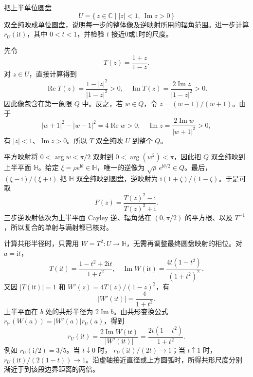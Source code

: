 \begin{exercise}\label{b3:ex:05-2}
把上半单位圆盘
\[
 U=\{\,z\in\mathbb C\mid |z|<1,\ \operatorname{Im}z>0\,\}
\]
双全纯映成单位圆盘，说明每一步的整体像及逆映射所用的辐角范围。进一步计算 \(r_U(\mathrm{i}t)\)，其中 \(0<t<1\)，并检验 \(t\) 接近0或1时的尺度。
\end{exercise}
\begin{solution}
先令
\[
 T(z)=\frac{1+z}{1-z}.
\]
对 \(z\in U\)，直接计算得到
\[
 \operatorname{Re}T(z)=\frac{1-|z|^2}{|1-z|^2}>0,
 \quad
 \operatorname{Im}T(z)=\frac{2\operatorname{Im}z}{|1-z|^2}>0.
\]
因此像包含在第一象限 \(Q\) 中。反之，若 \(w\in Q\)，令 \(z=(w-1)/(w+1)\)。由于
\[
 |w+1|^2-|w-1|^2=4\operatorname{Re}w>0,
 \quad
 \operatorname{Im}z=\frac{2\operatorname{Im}w}{|w+1|^2}>0,
\]
有 \(|z|<1\)、\(\operatorname{Im}z>0\)。所以 \(T\) 双全纯映 \(U\) 到整个 \(Q\)。

平方映射将 \(0<\arg w<\pi/2\) 双射到 \(0<\arg(w^2)<\pi\)，因此把 \(Q\) 双全纯映到上半平面 \(\mathbb H\)。给定 \(\xi=\rho e^{\mathrm{i}\theta}\in\mathbb H\)，唯一的逆像为 \(\sqrt{\rho}\,e^{\mathrm{i}\theta/2}\in Q\)。最后，\((\xi-\mathrm{i})/(\xi+\mathrm{i})\) 把 \(\mathbb H\) 双全纯映到圆盘，逆映射为 \(\mathrm{i}(1+\zeta)/(1-\zeta)\)。于是可取
\[
 F(z)=\frac{T(z)^2-\mathrm{i}}{T(z)^2+\mathrm{i}}.
\]
三步逆映射依次为上半平面 Cayley 逆、辐角落在 \((0,\pi/2)\) 的平方根、以及 \(T^{-1}\)，所以复合的单射与满射都已核对。

计算共形半径时，只需用 \(W=T^2:U\rightarrow\mathbb H\)，无需再调整最终圆盘映射的相位。对 \(a=\mathrm{i}t\)，
\[
 T(\mathrm{i}t)=\frac{1-t^2+2\mathrm{i}t}{1+t^2},
 \quad
 \operatorname{Im}W(\mathrm{i}t)
 =\frac{4t(1-t^2)}{(1+t^2)^2}.
\]
又因 \(|T(\mathrm{i}t)|=1\) 和 \(W'(z)=4T(z)/(1-z)^2\)，有
\[
 |W'(\mathrm{i}t)|=\frac4{1+t^2}.
\]
上半平面在 \(b\) 处的共形半径为 \(2\operatorname{Im}b\)。由共形变换公式
\(r_{\mathbb H}(W(a))=|W'(a)|r_U(a)\)，得到
\[
 r_U(\mathrm{i}t)
 =\frac{2\operatorname{Im}W(\mathrm{i}t)}{|W'(\mathrm{i}t)|}
 =\frac{2t(1-t^2)}{1+t^2}.
\]
例如 \(r_U(\mathrm{i}/2)=3/5\)。当 \(t\downarrow0\) 时，
\(r_U(\mathrm{i}t)/(2t)\to1\)；当 \(t\uparrow1\) 时，
\(r_U(\mathrm{i}t)/(2(1-t))\to1\)。沿虚轴接近直径或上方圆弧时，所得共形尺度分别渐近于到该段边界距离的两倍。
\end{solution}

